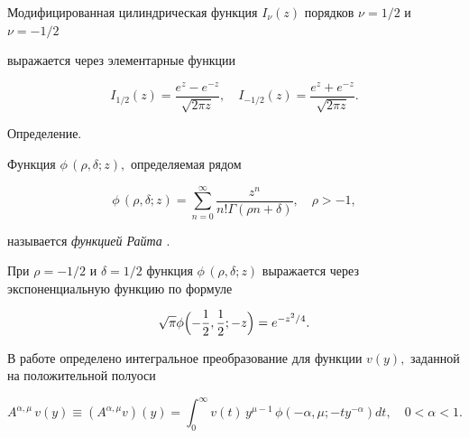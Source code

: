Модифицированная цилиндрическая функция $I_{\nu}(z)$ порядков $\nu=1/2 $  и $\nu=-1/2$ 

выражается через элементарные функции

\begin{equation}\label{I_1/2andI_-1/2}

I_{{1}/{2}}(z)=\frac{e^{z}-e^{-z}}{\sqrt{2\pi z}},\quad 

I_{-{1}/{2}}(z)=\frac{e^{z}+e^{-z}}{\sqrt{2\pi z}}.

\end{equation}



\smallskip

{\small \sc Определение.}

Функция $\phi\,(\rho,\delta;z),$ определяемая рядом 

$$

\phi\,(\rho,\delta;z)=\sum\limits_{n=0}^{\infty}\frac{z^{n}}{n! \Gamma(\rho n+\delta)}, \quad  \rho>-1,

$$

называется {\it функцией  Райта} \cite{Wright1, GorenfloLuchkoMainardi}.



\smallskip



При $\rho=-1/2$ и  $\delta=1/2$ функция $\phi\,(\rho,\delta;z)$ выражается через экспоненциальную функцию по формуле

\begin{equation}\label{phi(-1/2,1/2,z)}

\sqrt{\pi} 

\phi\Bigl(-\frac{1}{2}, \frac{1}{2}; - z\Bigr)=e^{-{z^2}/{4}}.

\end{equation}



\smallskip




В работе \cite[с.~72]{Pskhu} определено интегральное преобразование для функции $v(y),$ заданной на положительной полуоси 

\begin{equation}

\label{IntRight}

A^{\alpha, \mu}\,v(y)\equiv (A^{\alpha, \mu} v)(y)=

\int _{0}^{\infty} v(t)\,y^{\mu-1}\,

\phi\left(-\alpha,\mu;- t y^{- \alpha} \right)dt, \quad  0<\alpha<1.

\end{equation}

